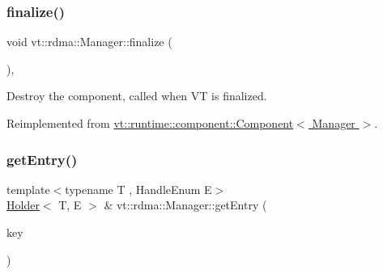 \subsubsection{\texorpdfstring{finalize()}{finalize()}}
{\footnotesize\ttfamily void vt\+::rdma\+::\+Manager\+::finalize (\begin{DoxyParamCaption}{ }\end{DoxyParamCaption})\hspace{0.3cm}{\ttfamily [override]}, {\ttfamily [virtual]}}



Destroy the component, called when VT is finalized. 



Reimplemented from \hyperlink{structvt_1_1runtime_1_1component_1_1_component_a098e362de01af6054e5491fba671a959}{vt\+::runtime\+::component\+::\+Component$<$ Manager $>$}.

\mbox{\label{structvt_1_1rdma_1_1_manager_a60c463246971a6d782e55f13fd60d092}} 
\subsubsection{\texorpdfstring{get\+Entry()}{getEntry()}}
{\footnotesize\ttfamily template$<$typename T , Handle\+Enum E$>$ \\
\hyperlink{structvt_1_1rdma_1_1_holder}{Holder}$<$ T, E $>$ \& vt\+::rdma\+::\+Manager\+::get\+Entry (\begin{DoxyParamCaption}\item[{\hyperlink{structvt_1_1rdma_1_1_handle_key}{Handle\+Key} const \&}]{key }\end{DoxyParamCaption})}

\mbox{\label{structvt_1_1rdma_1_1_manager_aad62be5c2cb0225139cf3d665b5fd7f2}} 

